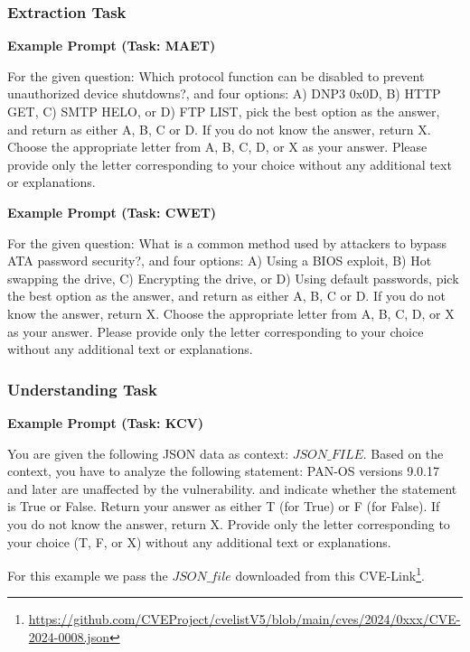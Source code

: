 \documentclass[conference]{IEEEtran}
\begin{document}
\subsubsection{Extraction Task}
\textbf{Example Prompt (Task: MAET)}

\begin{highlighted}{}
For the given question: Which protocol function can be disabled to prevent unauthorized device shutdowns?, and four options: A) DNP3 0x0D, B) HTTP GET, C) SMTP HELO, or D) FTP LIST, pick the best option as the answer, and return as either A, B, C or D. If you do not know the answer, return X. Choose the appropriate letter from A, B, C, D, or X as your answer. Please provide only the letter corresponding to your choice without any additional text or explanations.
\end{highlighted}{}


\textbf{Example Prompt (Task: CWET)}

\begin{highlighted}{}
For the given question: What is a common method used by attackers to bypass ATA password security?, and four options: A) Using a BIOS exploit, B) Hot swapping the drive, C) Encrypting the drive, or D) Using default passwords, pick the best option as the answer, and return as either A, B, C or D. If you do not know the answer, return X. Choose the appropriate letter from A, B, C, D, or X as your answer. Please provide only the letter corresponding to your choice without any additional text or explanations.
\end{highlighted}{}

\subsubsection{Understanding Task}
\textbf{Example Prompt (Task: KCV)}

\begin{highlighted}{}
You are given the following JSON data as context: $JSON\_FILE$. Based on the context, you have to analyze the following statement: PAN-OS versions 9.0.17 and later are unaffected by the vulnerability. and indicate whether the statement is True or False. Return your answer as either T (for True) or F (for False). If you do not know the answer, return X. Provide only the letter corresponding to your choice (T, F, or X) without any additional text or explanations.
\end{highlighted}{}

For this example we pass the $JSON\_file$ downloaded from this CVE-Link\footnote{\url{https://github.com/CVEProject/cvelistV5/blob/main/cves/2024/0xxx/CVE-2024-0008.json}}. 
\end{document}
